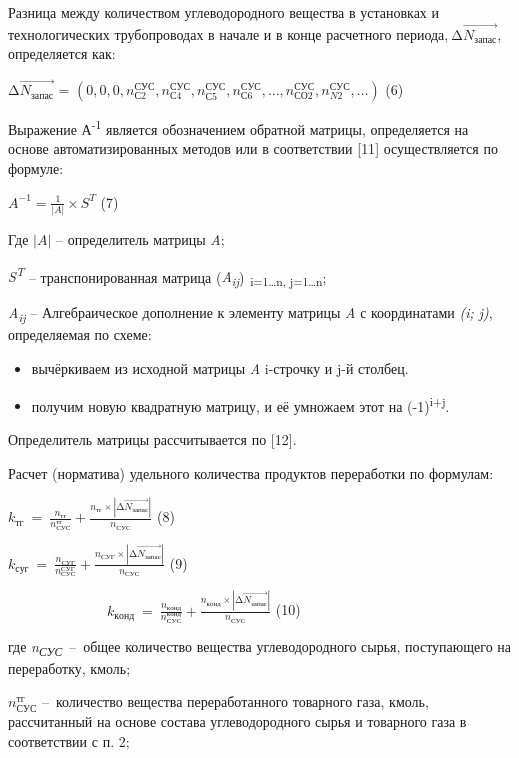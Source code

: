 Разница между количеством углеводородного вещества в установках и
технологических трубопроводах в начале и в конце расчетного
периода,\(\ \mathrm{\Delta}\overrightarrow{Ν_{запас}}\), определяется
как:

\(\mathrm{\Delta}\overrightarrow{Ν_{запас}}\) =
\(\left( 0,0,0,n_{С2}^{СУС},n_{С4}^{СУС},n_{С5}^{СУС},n_{С6}^{СУС},\ldots,n_{СО2}^{СУС},n_{N2}^{СУС},\ldots \right)\)
(6)

Выражение А\textsuperscript{-1} является обозначением обратной матрицы,
определяется на основе автоматизированных методов или в соответствии
{[}11{]} осуществляется по формуле:

\(A^{- 1} = \frac{1}{|A|} \times S^{T}\) (7)

Где \(|A|\) -- определитель матрицы \emph{A};

\emph{S\textsuperscript{T}} -- транспонированная матрица
(\textbar{}\emph{A\textsubscript{ij}}\textbar)\textsubscript{~i=1\ldots n,
j=1\ldots n};

\emph{A\textsubscript{ij}} -- Алгебраическое дополнение к элементу
матрицы \emph{A} с координатами \emph{(i; j)}, определяемая по схеме:

\begin{itemize}
\item
  вычёркиваем из исходной матрицы \emph{A} i-строчку и j-й столбец.
\item
  получим новую квадратную матрицу, и её умножаем этот на
  (-1)\textsuperscript{i+j}.
\end{itemize}

Определитель матрицы рассчитывается по {[}12{]}.

Расчет (норматива) удельного количества продуктов переработки по
формулам:

\(k_{тг}\  = \ \frac{n_{тг}}{n_{СУС}^{тг}} + \frac{n_{тг} \times \left| \mathrm{\Delta}\overrightarrow{Ν_{запас}} \right|}{n_{СУС}}\)
(8)

\(k_{суг}\  = \ \frac{n_{СУГ}}{n_{СУС}^{СУГ}} + \frac{n_{СУГ} \times \left| \mathrm{\Delta}\overrightarrow{Ν_{запас}} \right|}{n_{СУС}}\)
(9)

\(\ \ \ \ \ \ \ \ \ \ \ \ \ \ \ \ \ \ \ \ \ \ \ \ \ \ \ \ \ \ \ \ k_{конд}\  = \ \frac{n_{конд}}{n_{СУС}^{конд}} + \frac{n_{конд} \times \left| \mathrm{\Delta}\overrightarrow{Ν_{запас}} \right|}{n_{СУС}}\)
(10)

где \emph{n\textsubscript{СУС}}~--~общее количество вещества
углеводородного сырья, поступающего на переработку, кмоль;

\(n_{СУС}^{тг}\) --~количество вещества переработанного товарного газа,
кмоль, рассчитанный на основе состава углеводородного сырья и товарного
газа в соответствии с п. 2;

